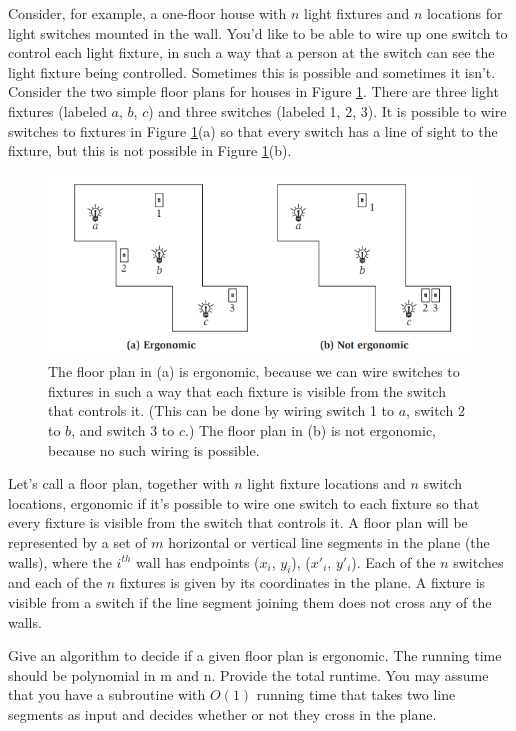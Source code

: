 \documentclass[letter,11pt]{article}
\begin{document}
Consider, for example, a one-floor house with $n$ light fixtures and $n$ locations for light switches mounted in the wall. You’d like to be able to wire up one switch to control each light fixture, in such a way that a person at the switch can see the light fixture being controlled. 
Sometimes this is possible and sometimes it isn’t. Consider the two simple floor plans for houses in Figure \ref{fig:q1}. There are three light fixtures (labeled $a$, $b$, $c$) and three switches (labeled 1, 2, 3). It is possible to wire switches to fixtures in Figure \ref{fig:q1}(a) so that every switch has a line of sight to the fixture, but this is not possible in Figure \ref{fig:q1}{}(b).
\begin{figure}[H]
  \centering
  \includegraphics[scale=1]{hw6-q1.png}
    \caption{The floor plan in (a) is ergonomic, because we can wire switches to fixtures in such a way that each fixture is visible from the switch that controls it. (This can be done by wiring switch 1 to $a$, switch 2 to $b$, and switch 3 to $c$.) The floor plan in (b) is not ergonomic, because no such wiring is possible.}
    \label{fig:q1}
\end{figure}
Let’s call a floor plan, together with $n$ light fixture locations and $n$ switch locations, ergonomic if it’s possible to wire one switch to each fixture so that every fixture is visible from the switch that controls it. A floor plan will be represented by a set of $m$ horizontal or vertical
line segments in the plane (the walls), where the $i^{th}$ wall has endpoints ($x_i$, $y_i$), ($x'_i$, $y'_i$). Each of the $n$ switches and each of the $n$ fixtures is given by its coordinates in the plane. A fixture is visible from a switch if the line segment joining them does not cross any of the walls.


Give an algorithm to decide if a given floor plan is ergonomic. The running time should be polynomial in m and n. Provide the total runtime. You may assume that you have a subroutine with $O(1)$ running time that takes two line segments as input and decides whether or not they cross in the plane.
\end{document}
